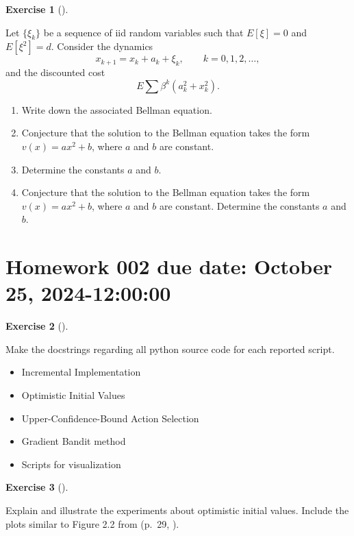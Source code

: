 \documentclass[
  letterpaper,
]{krantz}
\providecommand{\tightlist}{%
  \setlength{\itemsep}{0pt}\setlength{\parskip}{0pt}}\usepackage{longtable,booktabs,array}
\theoremstyle{plain}
\theoremstyle{definition}
\theoremstyle{definition}
\newtheorem{exercise}{Exercise}[chapter]
\theoremstyle{remark}
\begin{document}
\begin{exercise}[]\protect\hypertarget{exr-hw_001_06}{}\label{exr-hw_001_06}

Let \(\{\xi_k\}\) be a sequence of iid random variables such that
\(E[\xi]=0\) and \(E[\xi^2]=d\). Consider the dynamics \[ 
  x_{k+1} = x_k + a_k + \xi_k, \qquad 
  k= 0,1,2,\ldots, 
\] and the discounted cost \[
  E \sum \beta^k(a_k^2+x_k^2).
\]

\begin{enumerate}
\def\labelenumi{\roman{enumi})}
\item
  Write down the associated Bellman equation.
\item
  Conjecture that the solution to the Bellman equation takes the form
  \(v(x)=ax^2+b\), where \(a\) and \(b\) are constant.
\item
  Determine the constants \(a\) and \(b\).
\item
  Conjecture that the solution to the Bellman equation takes the form
  \(v(x)=ax^2+b\), where \(a\) and \(b\) are constant. Determine the
  constants \(a\) and \(b\).
\end{enumerate}

\end{exercise}

\section{Homework 002 due date: October 25,
2024-12:00:00}\label{homework-002-due-date-october-25-2024-120000}

\begin{exercise}[]\protect\hypertarget{exr-hw_002_01}{}\label{exr-hw_002_01}

Make the docstrings regarding all python source code for each reported
script.

\begin{itemize}
\tightlist
\item
  Incremental Implementation
\item
  Optimistic Initial Values
\item
  Upper-Confidence-Bound Action Selection
\item
  Gradient Bandit method
\item
  Scripts for visualization
\end{itemize}

\end{exercise}

\begin{exercise}[]\protect\hypertarget{exr-hw_002_02}{}\label{exr-hw_002_02}

Explain and illustrate the experiments about optimistic initial values.
Include the plots similar to Figure 2.2 from (p.~29,
).

\end{exercise}
\end{document}
